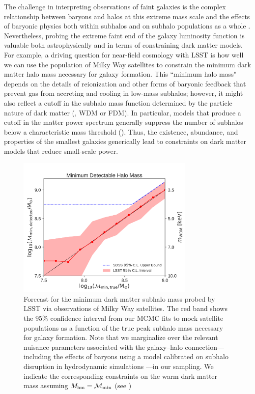 The challenge in interpreting observations of faint galaxies is the complex relationship between baryons and halos at this extreme mass scale and the effects of baryonic physics both within subhalos and on subhalo populations as a whole \citep[\eg,][]{DOnghia:2009xhq,Brooks:2012ah,errani2017,Garrison-Kimmel:2017zes,1811.11791,brooks2018}. Nevertheless, probing the extreme faint end of the galaxy luminosity function is valuable both astrophysically and in terms of constraining dark matter models. For example, a driving question for near-field cosmology with LSST is how well we can use the population of Milky Way satellites to constrain the minimum dark matter halo mass necessary for galaxy formation. 
This ``minimum halo mass" depends on the details of reionization and other forms of baryonic feedback that prevent gas from accreting and cooling in low-mass subhalos; however, it might also reflect a cutoff in the subhalo mass function determined by the particle nature of dark matter (\eg, WDM or FDM). In particular, models that produce a cutoff in the matter power spectrum generally suppress the number of subhalos below a characteristic mass threshold (). Thus, the existence, abundance, and properties of the smallest galaxies generically lead to constraints on dark matter models that reduce small-scale power.

\vspace{1em} 

\begin{figure}[t]
\centering
\includegraphics[width=0.775\textwidth]{figures/LSST_Mmin.pdf}
\caption{Forecast for the minimum dark matter subhalo mass probed by LSST via observations of Milky Way satellites. The red band shows the $95\%$ confidence interval from our MCMC fits to mock satellite populations as a function of the true peak subhalo mass necessary for galaxy formation. Note that we marginalize over the relevant nuisance parameters associated with the galaxy--halo connection---including the effects of baryons using a model calibrated on subhalo disruption in hydrodynamic simulations \citep{2018ApJ...859..129N}---in our sampling. We indicate the corresponding constraints on the warm dark matter mass assuming $M_{\rm hm} = \mathcal{M}_{\rm{min}}$ (see )}\label{fig:satellite_mmin}
\end{figure}

